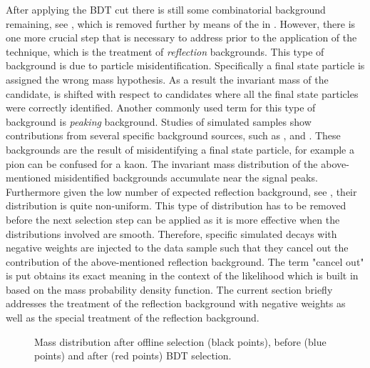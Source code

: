 After applying the BDT cut there is still some combinatorial background remaining, see ,
which is removed further by means of the \sWeights in .
However, there is one more crucial step that is necessary to address prior to the application of the
\sPlot technique, which is the treatment of {\it reflection} backgrounds. This type of background is due to particle misidentification.
Specifically a final state particle is assigned the wrong mass hypothesis. As a result the invariant mass of the \Bs candidate,
is shifted with respect to \Bs candidates where all the final state particles were correctly identified.
Another commonly used term for this type of background is {\it peaking} background. Studies of simulated samples show contributions
from several specific background sources, such as \BsJpsiKK, \BsJpsipipi and \BdJpsipipi.
These backgrounds are the result of misidentifying a final state particle, for example a pion can
be confused for a kaon. The invariant mass distribution of the above-mentioned misidentified backgrounds
accumulate near the \BJpsiKpi signal peaks. Furthermore given the low number of expected reflection background,
see , their distribution is quite non-uniform.
This type of distribution has to be removed before the next selection step can be applied as it is more effective
when the distributions involved are smooth. Therefore, specific simulated decays with negative weights
are injected to the data sample such that they cancel out the contribution of the above-mentioned reflection
background. The term "cancel out" is put obtains its exact meaning in the context of the likelihood which is 
built in  based on the mass probability density function.
The current section briefly addresses the treatment of the reflection background with negative weights
as well as the special treatment of the \LbJpsippi reflection background.

\begin{figure}[!t]
  \centering
  \scalebox{1}{}
  \caption{Mass distribution after offline selection (black points), before (blue points) and after (red points) BDT selection.}
  \label{mass_BDTG_selection}
\end{figure}

